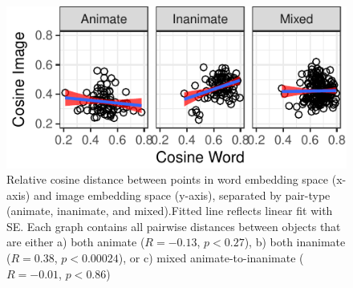 \documentclass[10pt, letterpaper]{article}
\newenvironment{CodeChunk}{}{}
\begin{document}
\begin{CodeChunk}
\begin{figure}[tb]
\includegraphics{figs/pairwise-corr-animate-vs-not-1} \caption[Relative cosine distance between points in word embedding space (x-axis) and image embedding space (y-axis), separated by pair-type (animate, inanimate, and mixed).Fitted line reflects linear fit with SE]{Relative cosine distance between points in word embedding space (x-axis) and image embedding space (y-axis), separated by pair-type (animate, inanimate, and mixed).Fitted line reflects linear fit with SE. Each graph contains all pairwise distances between objects that are either a) both animate ($R = -0.13$, $p < 0.27$), b) both inanimate ($R = 0.38$, $p < 0.00024$), or c) mixed animate-to-inanimate ($R = -0.01$, $p < 0.86$)}\label{fig:pairwise-corr-animate-vs-not}
\end{figure}
\end{CodeChunk}
\end{document}
